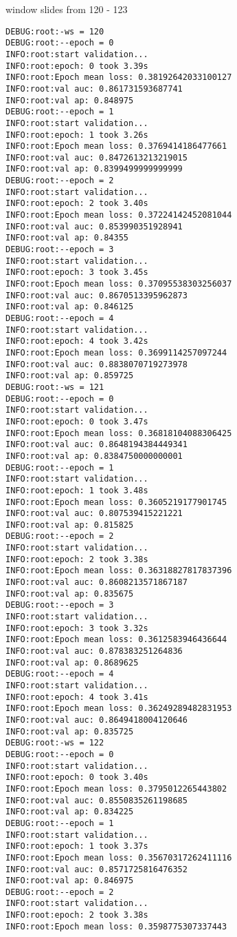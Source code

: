 \documentclass[11pt]{article}
\begin{document}
window slides from 120 - 123
\begin{verbatim}
DEBUG:root:-ws = 120
DEBUG:root:--epoch = 0
INFO:root:start validation...
INFO:root:epoch: 0 took 3.39s
INFO:root:Epoch mean loss: 0.38192642033100127
INFO:root:val auc: 0.861731593687741
INFO:root:val ap: 0.848975
DEBUG:root:--epoch = 1
INFO:root:start validation...
INFO:root:epoch: 1 took 3.26s
INFO:root:Epoch mean loss: 0.3769414186477661
INFO:root:val auc: 0.8472613213219015
INFO:root:val ap: 0.8399499999999999
DEBUG:root:--epoch = 2
INFO:root:start validation...
INFO:root:epoch: 2 took 3.40s
INFO:root:Epoch mean loss: 0.37224142452081044
INFO:root:val auc: 0.853990351928941
INFO:root:val ap: 0.84355
DEBUG:root:--epoch = 3
INFO:root:start validation...
INFO:root:epoch: 3 took 3.45s
INFO:root:Epoch mean loss: 0.37095538303256037
INFO:root:val auc: 0.8670513395962873
INFO:root:val ap: 0.846125
DEBUG:root:--epoch = 4
INFO:root:start validation...
INFO:root:epoch: 4 took 3.42s
INFO:root:Epoch mean loss: 0.3699114257097244
INFO:root:val auc: 0.8838070719273978
INFO:root:val ap: 0.859725
DEBUG:root:-ws = 121
DEBUG:root:--epoch = 0
INFO:root:start validation...
INFO:root:epoch: 0 took 3.47s
INFO:root:Epoch mean loss: 0.36818104088306425
INFO:root:val auc: 0.8648194384449341
INFO:root:val ap: 0.8384750000000001
DEBUG:root:--epoch = 1
INFO:root:start validation...
INFO:root:epoch: 1 took 3.48s
INFO:root:Epoch mean loss: 0.3605219177901745
INFO:root:val auc: 0.807539415221221
INFO:root:val ap: 0.815825
DEBUG:root:--epoch = 2
INFO:root:start validation...
INFO:root:epoch: 2 took 3.38s
INFO:root:Epoch mean loss: 0.36318827817837396
INFO:root:val auc: 0.8608213571867187
INFO:root:val ap: 0.835675
DEBUG:root:--epoch = 3
INFO:root:start validation...
INFO:root:epoch: 3 took 3.32s
INFO:root:Epoch mean loss: 0.3612583946436644
INFO:root:val auc: 0.878383251264836
INFO:root:val ap: 0.8689625
DEBUG:root:--epoch = 4
INFO:root:start validation...
INFO:root:epoch: 4 took 3.41s
INFO:root:Epoch mean loss: 0.36249289482831953
INFO:root:val auc: 0.8649418004120646
INFO:root:val ap: 0.835725
DEBUG:root:-ws = 122
DEBUG:root:--epoch = 0
INFO:root:start validation...
INFO:root:epoch: 0 took 3.40s
INFO:root:Epoch mean loss: 0.3795012265443802
INFO:root:val auc: 0.8550835261198685
INFO:root:val ap: 0.834225
DEBUG:root:--epoch = 1
INFO:root:start validation...
INFO:root:epoch: 1 took 3.37s
INFO:root:Epoch mean loss: 0.35670317262411116
INFO:root:val auc: 0.8571725816476352
INFO:root:val ap: 0.846975
DEBUG:root:--epoch = 2
INFO:root:start validation...
INFO:root:epoch: 2 took 3.38s
INFO:root:Epoch mean loss: 0.3598775307337443

\end{verbatim}
\end{document}
